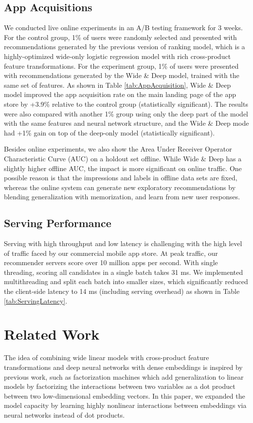 \documentclass{sig-alternate-05-2015}
\begin{document}
\subsection{App Acquisitions}
We conducted live online experiments in an A/B testing framework for 3 weeks. For the control group, 1\% of users were randomly selected and presented with recommendations generated by the previous version of ranking model, which is a highly-optimized wide-only logistic regression model with rich cross-product feature transformations. For the experiment group, 1\% of users were presented with recommendations generated by the Wide \& Deep model, trained with the same set of features. As shown in Table \ref{tab:AppAcquisition}, Wide \& Deep model improved the app acquisition rate on the main landing page of the app store by +3.9\% relative to the control group (statistically significant). The results were also compared with another 1\% group using only the deep part of the model with the same features and neural network structure, and the Wide \& Deep mode had +1\% gain on top of the deep-only model (statistically significant). 

Besides online experiments, we also show the Area Under Receiver Operator Characteristic Curve (AUC) on a holdout set offline. While Wide \& Deep has a slightly higher offline AUC, the impact is more significant on online traffic. One possible reason is that the impressions and labels in offline data sets are fixed, whereas the online system can generate new exploratory recommendations by blending generalization with memorization, and learn from new user responses.

\subsection{Serving Performance}
Serving with high throughput and low latency is challenging with the high level of traffic faced by our commercial mobile app store. At peak traffic, our recommender servers score over 10 million apps per second. With single threading, scoring all candidates in a single batch takes 31 ms. We implemented multithreading and split each batch into smaller sizes, which significantly reduced the client-side latency to 14 ms (including serving overhead) as shown in Table \ref{tab:ServingLatency}.

\section{Related Work}
The idea of combining wide linear models with cross-product feature transformations and deep neural networks with dense embeddings is inspired by previous work, such as factorization machines \cite{LibFMTIST12} which add generalization to linear models by factorizing the interactions between two variables as a dot product between two low-dimensional embedding vectors. In this paper, we expanded the model capacity by learning highly nonlinear interactions between embeddings via neural networks instead of dot products.
\end{document}

